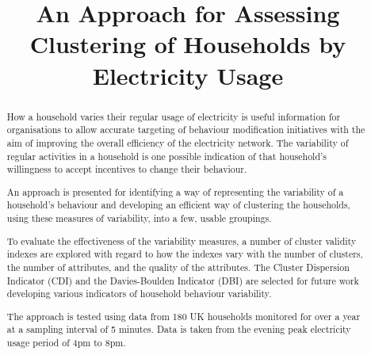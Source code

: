 \documentclass[conference]{IEEEtran}
\begin{document}
\title{An Approach for Assessing Clustering of Households by Electricity Usage}






\author{
}










\maketitle


\begin{abstract}
How a household varies their regular usage of electricity is useful information for organisations to allow accurate targeting of behaviour modification initiatives with the aim of improving the overall efficiency of the electricity network.  The variability of regular activities in a household is one possible indication of that household's willingness to accept incentives to change their behaviour. 

An approach is presented for identifying a way of representing the variability of a household's behaviour and developing an efficient way of clustering the households, using these measures of variability, into a few, usable groupings.

To evaluate the effectiveness of the variability measures, a number of cluster validity indexes are explored with regard to how the indexes vary with the number of clusters, the number of attributes, and the quality of the attributes. The Cluster Dispersion Indicator (CDI) and the Davies-Boulden Indicator (DBI) are selected for future work developing various indicators of household behaviour variability.

The approach is tested using data from 180 UK households monitored for over a year at a sampling interval of 5 minutes. Data is taken from the evening peak electricity usage period of 4pm to 8pm.

\end{abstract}
\end{document}

